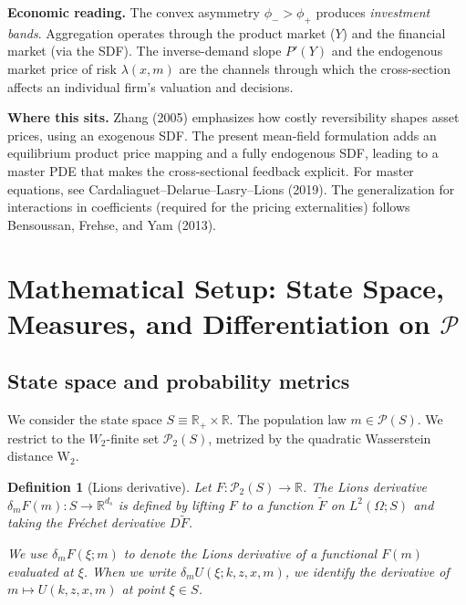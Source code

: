 \documentclass[11pt,letterpaper,oneside]{article}
\newtheorem{definitionT}{Definition}
\newenvironment{definition}[2]{\begin{definitionT}[#1]\label{def:#2}}{\end{definitionT}}
\newcommand{\R}{\mathbb{R}}
\newcommand{\dmU}{\delta_m U}
\newcommand{\Dm}{\delta_m}
\newcommand{\extbf}[1]{\textbf{#1}}
\begin{document}
\begin{tcolorbox}[didacticstyle]
  \extbf{Economic reading.} The convex asymmetry $\phi_->\phi_+$ produces \emph{investment bands}. Aggregation operates through the product market ($Y$) and the financial market (via the SDF). The inverse-demand slope $P'(Y)$ and the endogenous market price of risk $\lambda(x,m)$ are the channels through which the cross-section affects an individual firm's valuation and decisions.
\end{tcolorbox}

\begin{tcolorbox}[literaturestyle]
  \extbf{Where this sits.} Zhang (2005) emphasizes how costly reversibility shapes asset prices, using an exogenous SDF. The present mean-field formulation adds an equilibrium product price mapping and a fully endogenous SDF, leading to a master PDE that makes the cross-sectional feedback explicit. For master equations, see Cardaliaguet--Delarue--Lasry--Lions (2019). The generalization for interactions in coefficients (required for the pricing externalities) follows Bensoussan, Frehse, and Yam (2013).
\end{tcolorbox}

\section{Mathematical Setup: State Space, Measures, and Differentiation on \texorpdfstring{$\mathcal P$}{P}}

\subsection{State space and probability metrics}
We consider the state space $S\equiv \R_+\times\R$. The population law $m\in\mathcal P(S)$. We restrict to the $W_2$-finite set $\mathcal P_2(S)$, metrized by the quadratic Wasserstein distance $\mathrm{W}_2$.

\begin{definition}{Lions derivative}{lions}
Let $F:\mathcal P_2(S)\to\R$. The \emph{Lions derivative} $\Dm F(m):S\to\R^{d_s}$ is defined by lifting $F$ to a function $\tilde F$ on $L^2(\Omega;S)$ and taking the Fréchet derivative $D\tilde F$.

We use $\delta_m F(\xi; m)$ to denote the Lions derivative of a functional $F(m)$ evaluated at $\xi$. When we write $\dmU(\xi;k,z,x,m)$, we identify the derivative of $m\mapsto U(k,z,x,m)$ at point $\xi\in S$.
\end{definition}
\end{document}
